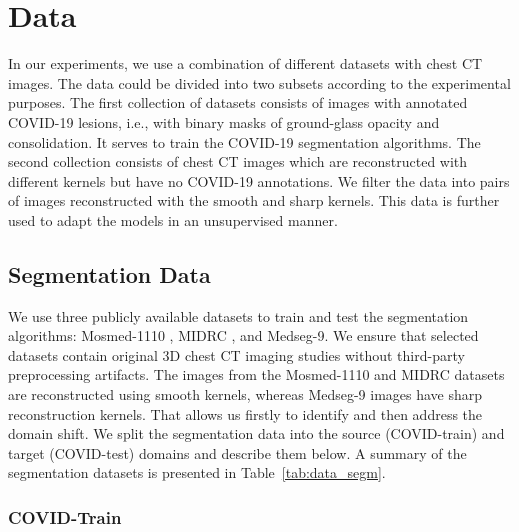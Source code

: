 \section{Data}

In our experiments, we use a combination of different datasets with chest CT images. The data could be divided into two subsets according to the experimental purposes. The first collection of datasets consists of images with annotated COVID-19 lesions, i.e., with binary masks of ground-glass opacity and consolidation. It serves to train the COVID-19 segmentation algorithms. The second collection consists of chest CT images which are reconstructed with different kernels but have no COVID-19 annotations. We filter the data into pairs of images reconstructed with the smooth and sharp kernels. This data is further used to adapt the models in an unsupervised manner.


\subsection{Segmentation Data}

We use three publicly available datasets to train and test the segmentation algorithms: Mosmed-1110 \cite{morozov2020mosmeddata}, MIDRC \cite{tsai2021rsna}, and Medseg-9. We ensure that selected datasets contain original 3D chest CT imaging studies without third-party preprocessing artifacts. The images from the Mosmed-1110 and MIDRC datasets are reconstructed using smooth kernels, whereas Medseg-9 images have sharp reconstruction kernels. That allows us firstly to identify and then address the domain shift. We split the segmentation data into the source (COVID-train) and target (COVID-test) domains and describe them below. A summary of the segmentation datasets is presented in Table~\ref{tab:data_segm}.




\subsubsection{COVID-Train}

